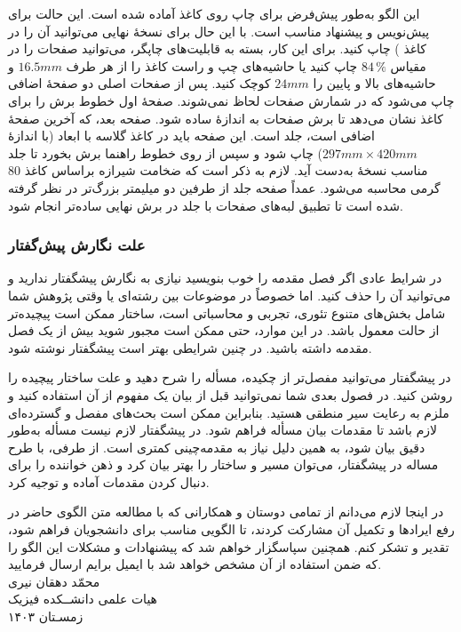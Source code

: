 این الگو به‌طور پیش‌فرض برای چاپ روی کاغذ 
آماده شده است. این حالت برای پیش‌نویس و پیشنهاد
\thesis 
مناسب است. با این حال برای نسخهٔ نهایی 
\thesis 
می‌توانید آن را در کاغذ 
) 
چاپ کنید. برای این کار، بسته به قابلیت‌های چاپگر، می‌توانید صفحات را در مقیاس 
$84\,\%$ 
چاپ کنید یا حاشیه‌های چپ و راست کاغذ 
را از هر طرف 
$16.5\unit{mm}$ 
و حاشیه‌های بالا و پایین را 
$24\unit{mm}$ 
کوچک کنید. پس از صفحات اصلی 
\thesis 
دو صفحهٔ اضافی چاپ می‌شود که در شمارش صفحات لحاظ نمی‌شوند. صفحهٔ اول خطوط برش را برای کاغذ 
نشان می‌دهد تا برش صفحات به اندازهٔ 
ساده شود. صفحه بعد، که آخرین صفحهٔ اضافی است، جلد است. این صفحه باید در کاغذ گلاسه با ابعاد 
(با اندازهٔ 
$297\unit{mm} \times 420\unit{mm}$) 
چاپ شود و سپس از روی خطوط راهنما برش بخورد تا جلد مناسب نسخهٔ
به‌دست آید. لازم به ذکر است که ضخامت شیرازه براساس کاغذ $80$ گرمی محاسبه می‌شود. عمداً صفحه جلد از طرفین دو میلیمتر بزرگ‌تر در نظر گرفته شده است تا تطبیق لبه‌های صفحات با جلد در برش نهایی ساده‌تر انجام شود.


\subsubsection{علت نگارش پیش‌گفتار}
در شرایط عادی اگر فصل مقدمه را خوب بنویسید نیازی به نگارش پیشگفتار ندارید و می‌توانید آن را حذف کنید. اما خصوصاً در موضوعات بین رشته‌ای یا وقتی پژوهش شما شامل بخش‌های متنوع تئوری، تجربی و محاسباتی است، ساختار 
\thesis 
ممکن است پیچیده‌تر از حالت معمول باشد. در این موارد، حتی ممکن است مجبور شوید بیش از یک فصل مقدمه داشته باشید. در چنین شرایطی بهتر است پیشگفتار نوشته شود. 

در پیشگفتار می‌توانید مفصل‌تر از چکیده، مسأله را شرح دهید و علت ساختار پیچیده 
\thesis 
را روشن کنید. در فصول بعدی شما نمی‌توانید قبل از بیان یک مفهوم از آن استفاده کنید و ملزم به رعایت سیر منطقی هستید. بنابراین ممکن است بحث‌های مفصل و گسترده‌ای لازم باشد تا مقدمات بیان مسأله فراهم شود. در پیشگفتار لازم نیست مسأله به‌طور دقیق بیان شود، به همین دلیل نیاز به مقدمه‌چینی کمتری است. از طرفی، با طرح مساله در پیشگفتار، می‌توان مسیر و ساختار 
\thesis 
را بهتر بیان کرد و ذهن خواننده را برای دنبال کردن مقدمات آماده و توجیه کرد.

در اینجا لازم می‌دانم از تمامی دوستان و همکارانی که با مطالعه متن الگوی حاضر در رفع ایرادها و تکمیل آن مشارکت کردند، تا الگویی مناسب برای دانشجویان فراهم شود، تقدیر و تشکر کنم. همچنین سپاسگزار خواهم شد که پیشنهادات و مشکلات این الگو را که ضمن استفاده از آن  مشخص خواهد شد با ایمیل%
برایم ارسال فرمایید.\\[1em]
محمّد دهقان نیری\\
هیات علمی دانشــکده فیزیک\\
زمسـتان ۱۴۰۳

